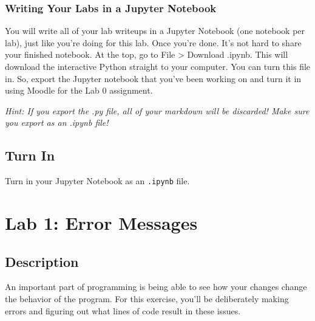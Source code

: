 \subsubsection*{Writing Your Labs in a Jupyter Notebook}
You will write all of your lab writeups in a Jupyter Notebook (one notebook per lab), just like you're doing for this lab. Once you're done. It's not hard to share your finished notebook. At the top, go to File > Download .ipynb. This will download the interactive Python straight to your computer. You can turn this file in. So, export the Jupyter notebook that you've been working on and turn it in using Moodle for the Lab 0 assignment.\par
\textit{Hint: If you export the .py file, all of your markdown will be discarded! Make sure you export as an .ipynb file!}
\subsection*{Turn In}
Turn in your Jupyter Notebook as an \verb|.ipynb| file.

\section*{Lab 1: Error Messages}
\subsection*{Description}
An important part of programming is being able to see how your changes change the behavior of the program. For this exercise, you'll be deliberately making errors and figuring out what lines of code result in these issues.
